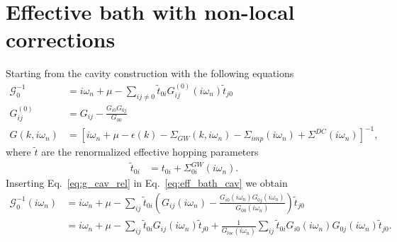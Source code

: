 \documentclass[12pt,a4paper]{scrartcl}
\numberwithin{equation}{section}
\begin{document}
\clearpage

\section{Effective bath with non-local corrections}
Starting from the cavity construction with the following
equations
\begin{align}
 \mathcal{G}_0^{-1}
 &= i\omega_n + \mu - \sum_{ij\neq 0} \tilde{t}_{0i} G^{(0)}_{ij}(i\omega_n) \tilde{t}_{j0} \label{eq:eff_bath_cav}\\
 G^{(0)}_{ij}
 &= G_{ij} - \frac{ G_{i0}G_{0j} }{ G_{00} } \label{eq:g_cav_rel} \\
 G(k,i\omega_n)
 &= \left[ i\omega_n + \mu - \epsilon(k) - \Sigma_{GW}(k,i\omega_n)
    -\Sigma_{imp}(i\omega_n) + \Sigma^{DC}(i\omega_n)\right]^{-1},
\end{align}
where $\tilde{t}$ are the renormalized effective hopping parameters
\begin{align}
 \tilde{t}_{0i} &= t_{0i} + \Sigma^{GW}_{0i}(i\omega_n) . 
\end{align}
Inserting Eq.~\eqref{eq:g_cav_rel} in Eq.~\eqref{eq:eff_bath_cav} we obtain
\begin{align}
 \mathcal{G}_0^{-1}(i\omega_n)
 &= i\omega_n + \mu - \sum_{ij} \tilde{t}_{0i} 
 \left( G_{ij}(i\omega_n) - \frac{ G_{i0}(i\omega_n)G_{0j}(i\omega_n) }{ G_{00}(i\omega_n) } \right) \tilde{t}_{j0} \\
&= i\omega_n + \mu - \sum_{ij} \tilde{t}_{0i} G_{ij}(i\omega_n)\tilde{t}_{j0}
   + \frac{1}{G_{loc}(i\omega_n)} \sum_{ij} \tilde{t}_{0i} G_{i0}(i\omega_n)G_{0j}(i\omega_n) \tilde{t}_{j0} .
 \end{align}
\end{document}

